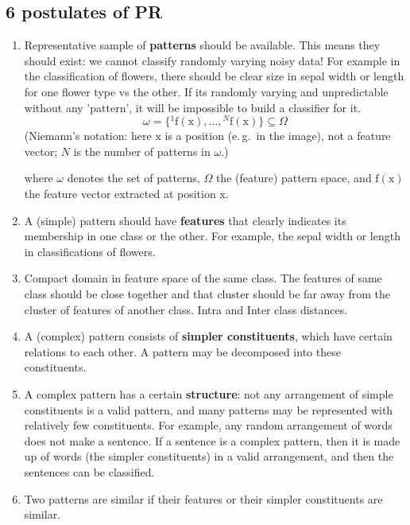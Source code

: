 \documentclass{article}
\DeclareRobustCommand{\vect}[1]{\ensuremath{\bm{\mathrm{#1}}}}
\begin{document}
\subsection{6 postulates of PR}
\begin{enumerate}
    \item Representative sample of \textbf{patterns} should be available. This means they should exist: we cannot classify randomly varying noisy data!
    For example in the classification of flowers, there should be clear size in sepal width or length for one flower type vs the other. If its randomly varying and unpredictable without any 'pattern', it will be impossible to build a classifier for it. 
     \begin{displaymath}
           \omega = \{{}^1\vect{f}(\vect{x}),\ldots,{}^N\vect{f}(\vect{x})\} \subseteq \Omega
        \end{displaymath}
        {\footnotesize (Niemann's notation: here $\vect x$ is a position (e.\,g.\ in the image), not a feature vector; $N$ is the number of patterns in $\omega$.) \autocite{niemann1983}}

        where $\omega$ denotes the set of patterns, $\Omega$ the (feature) pattern space, and $\vect f(\vect x)$ the feature vector extracted at position $\vect x$.
    \item A (simple) pattern should have \textbf{features} that clearly indicates its membership in one class or the other. For example, the sepal width or length in classifications of flowers. 
    \item Compact domain in feature space of the same class. The features of same class should be close together and that cluster should be far away from the cluster of features of another class. 
    Intra and Inter class distances.
    \item A (complex) pattern consists of \textbf{simpler constituents}, which have certain relations to each other. A pattern may be decomposed into these constituents.
    \item A complex pattern has a certain \textbf{structure}: not any arrangement of simple constituents is a valid pattern, and many patterns may be represented with relatively few constituents. For example, any random arrangement of words does not make a sentence. If a sentence is a complex pattern, then it is made up of words (the simpler constituents) in a valid arrangement, and then the sentences can be classified. 
    \item Two patterns are similar if their features or their simpler constituents are similar. 
\end{enumerate}
\end{document}
